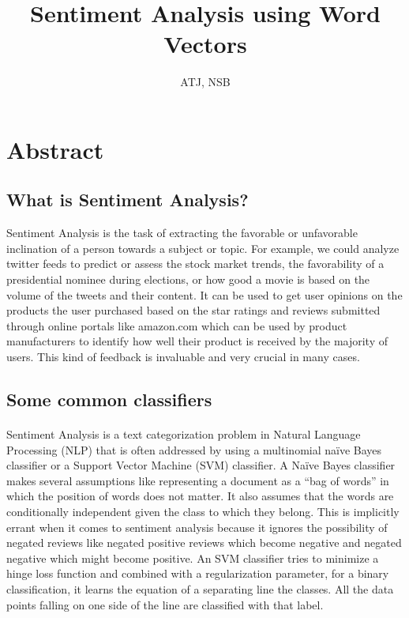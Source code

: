 \documentclass[11pt, oneside]{article}   	%
\title{\color{astral}Sentiment Analysis using Word Vectors}
\author{ATJ, NSB}
\date{}							%
\begin{document}
\maketitle
{}
\newpage
{}
\section*{Abstract}
\subsection*{What is Sentiment Analysis?}
Sentiment Analysis is the task of extracting the favorable or unfavorable inclination of a person towards a subject or topic. For example, we could analyze twitter feeds to predict or assess the stock market trends, the favorability of a presidential nominee during elections, or how good a movie is based on the volume of the tweets and their content. It can be used to get user opinions on the products the user purchased based on the star ratings and reviews submitted through online portals like amazon.com which can be used by product manufacturers to identify how well their product is received by the majority of users. This kind of feedback is invaluable and very crucial in many cases.
\subsection*{Some common classifiers}
\paragraph{}
Sentiment Analysis is a text categorization problem in Natural Language Processing (NLP) that is often addressed by using a multinomial naïve Bayes classifier or a Support Vector Machine (SVM) classifier. A Naïve Bayes classifier makes several assumptions like representing a document as a “bag of words” in which the position of words does not matter. It also assumes that the words are conditionally independent given the class to which they belong. This is implicitly errant when it comes to sentiment analysis because it ignores the possibility of negated reviews like negated positive reviews which become negative and negated negative which might become positive. An SVM classifier tries to minimize a hinge loss function and combined with a regularization parameter, for a binary classification, it learns the equation of a separating line the classes. All the data points falling on one side of the line are classified with that label.
\end{document}
